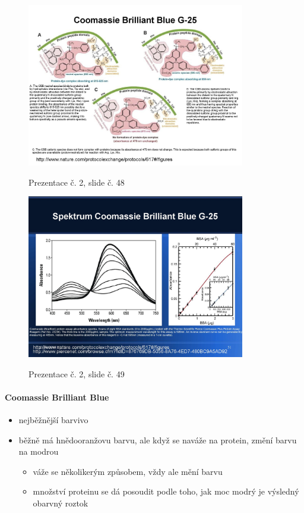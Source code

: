 \documentclass[DIV=8]{scrreprt}
\begin{document}
\begin{figure}
    \caption{Prezentace č. 2, slide č. 48}
    \includegraphics[width=0.85\textwidth]{slides-2/slide-48.jpg}
    \centering
    \label{slides-2-slide-48}
\end{figure}
\begin{figure}
    \caption{Prezentace č. 2, slide č. 49}
    \includegraphics[width=0.85\textwidth]{slides-2/slide-49.jpg}
    \centering
    \label{slides-2-slide-49}
\end{figure}

\paragraph{Coomassie Brilliant Blue}
\begin{itemize}[nosep]
    \item nejběžnější barvivo
    \item běžně má hnědooranžovu barvu, ale když se naváže na protein, změní barvu na modrou
\begin{itemize}[nosep]
    \item váže se několikerým způsobem, vždy ale mění barvu
    \item množství proteinu se dá posoudit podle toho, jak moc modrý je výsledný obarvný roztok
\end{itemize}

\end{itemize}
\end{document}
